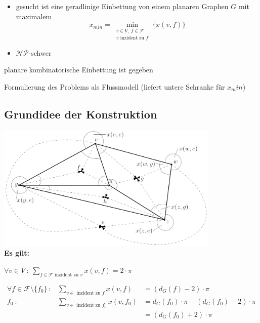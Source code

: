 \begin{itemize}[itemsep=-1pt]
	\item gesucht ist eine geradlinige Einbettung von einem planaren Graphen $G$ mit maximalem
		\[x_{min}=\min\limits_{\substack{v\in V,~f\in \mathcal{F}\\v\text{ inzident zu }f}}\{x(v,f)\}\]
	\item $\mathcal{NP}$-schwer
\end{itemize}
\begin{description}[itemsep=-1pt]
	\item[Einschränkung:] planare kombinatorische Einbettung ist gegeben
	\item[Modell:] Formulierung des Problems als Flussmodell (liefert untere Schranke für $x_min$)
\end{description}
\subsection{Grundidee der Konstruktion}
\includegraphics[width=0.8\textwidth]{Pics/3_construction.png}\\
\textbf{Es gilt:}
\begin{description}[itemsep=-1pt]
	\item[1. Knotenbedingung:] $\forall v\in V~:~\sum\limits_{f\in \mathcal{F}\text{ inzident zu }v}x(v,f)=2\cdot\pi$
	\item[2. Facettenbedingung:] 
		\begin{eqnarray*}
			\forall f\in \mathcal{F}\setminus\{f_0\}~:&\sum\limits_{v\in \text{ inzident zu }f}x(v,f)&=(d_G(f)-2)\cdot\pi\\
			f_0~:&\sum\limits_{v\in \text{ inzident zu }f_0}x(v,f_0)&=d_G(f_0)\cdot\pi-(d_G(f_0)-2)\cdot\pi\\
			&&=(d_G(f_0)+2)\cdot \pi
		\end{eqnarray*}
\end{description}
\topbreak
\vspace*{-2\baselineskip}
